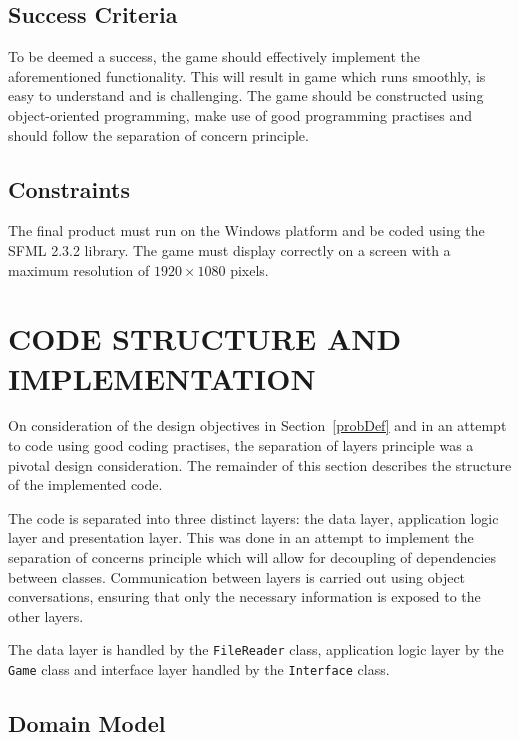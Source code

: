 \documentclass[10pt,twocolumn]{witseiepaper}
\begin{document}
\subsection{Success Criteria}

To be deemed a success, the game should effectively implement the aforementioned functionality. This will result in game which runs smoothly, is easy to understand and is challenging. The game should be constructed using object-oriented programming, make use of good programming practises and should follow the separation of concern principle. 

\subsection{Constraints}

The final product must run on the Windows platform and be coded using the SFML 2.3.2 library. The game must display correctly on a screen with a maximum resolution of $1920 \times 1080$ pixels.

\section{CODE STRUCTURE AND IMPLEMENTATION}

On consideration of the design objectives in Section~\ref{probDef} and in an attempt to code using good coding practises, the separation of layers principle was a pivotal design consideration. The remainder of this section describes the structure of the implemented code.

The code is separated into three distinct layers: the data layer, application logic layer and presentation layer. This was done in an attempt to implement the separation of concerns principle which will allow for decoupling of dependencies between classes. Communication between layers is carried out using object conversations, ensuring that only the necessary information is exposed to the other layers.

The data layer is handled by the \texttt{FileReader} class, application logic layer by the \texttt{Game} class and interface layer handled by the \texttt{Interface} class.

\subsection{Domain Model}
\end{document}
